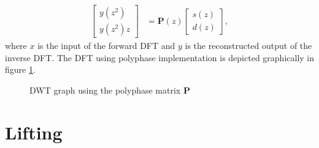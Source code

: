\begin{refsection}
\begin{align}
\\
\begin{bmatrix}
	y(z^2) \\
	y(z^2) z
\end{bmatrix}
&=
\bm P(z)
\begin{bmatrix}
	s(z) \\
	d(z)
\end{bmatrix}
,
\end{align}
where $x$ is the input of the forward DFT and $y$ is the reconstructed output of the inverse DFT.
The DFT using polyphase implementation is depicted graphically in figure \ref{fpga:fig:liftingSteps}.
\begin{figure}
	\centering
	
	\caption{DWT graph using the polyphase matrix $\bm P$}
	\label{fpga:fig:liftingSteps}
\end{figure}

\section{Lifting}


\end{refsection}
